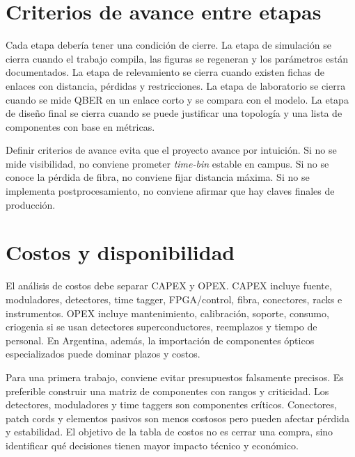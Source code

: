 \section{Criterios de avance entre etapas}

Cada etapa debería tener una condición de cierre. La etapa de simulación se cierra cuando el trabajo compila, las figuras se regeneran y los parámetros están documentados. La etapa de relevamiento se cierra cuando existen fichas de enlaces con distancia, pérdidas y restricciones. La etapa de laboratorio se cierra cuando se mide QBER en un enlace corto y se compara con el modelo. La etapa de diseño final se cierra cuando se puede justificar una topología y una lista de componentes con base en métricas.

Definir criterios de avance evita que el proyecto avance por intuición. Si no se mide visibilidad, no conviene prometer \textit{time-bin} estable en campus. Si no se conoce la pérdida de fibra, no conviene fijar distancia máxima. Si no se implementa postprocesamiento, no conviene afirmar que hay claves finales de producción.

\section{Costos y disponibilidad}

El análisis de costos debe separar CAPEX y OPEX. CAPEX incluye fuente, moduladores, detectores, time tagger, FPGA/control, fibra, conectores, racks e instrumentos. OPEX incluye mantenimiento, calibración, soporte, consumo, criogenia si se usan detectores superconductores, reemplazos y tiempo de personal. En Argentina, además, la importación de componentes ópticos especializados puede dominar plazos y costos.

Para una primera trabajo, conviene evitar presupuestos falsamente precisos. Es preferible construir una matriz de componentes con rangos y criticidad. Los detectores, moduladores y time taggers son componentes críticos. Conectores, patch cords y elementos pasivos son menos costosos pero pueden afectar pérdida y estabilidad. El objetivo de la tabla de costos no es cerrar una compra, sino identificar qué decisiones tienen mayor impacto técnico y económico.
